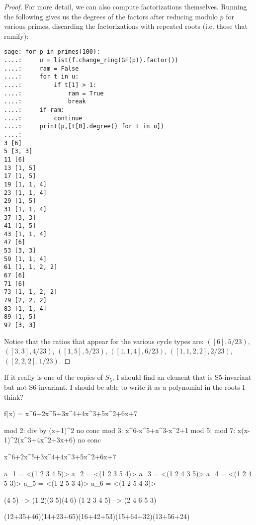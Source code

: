 \begin{proof}
	For more detail, we can also compute factorizations themselves. Running the following gives us the degrees of the factors after reducing modulo $p$ for various primes, discarding the factorizations with repeated roots (i.e. those that ramify):
	\begin{verbatim}
sage: for p in primes(100):
....:     u = list(f.change_ring(GF(p)).factor())
....:     ram = False
....:     for t in u:
....:         if t[1] > 1:
....:             ram = True
....:             break
....:     if ram:
....:         continue
....:     print(p,[t[0].degree() for t in u])
....:     
3 [6]
5 [3, 3]
11 [6]
13 [1, 5]
17 [1, 5]
19 [1, 1, 4]
23 [1, 1, 4]
29 [1, 5]
31 [1, 1, 4]
37 [3, 3]
41 [1, 5]
43 [1, 1, 4]
47 [6]
53 [3, 3]
59 [1, 1, 4]
61 [1, 1, 2, 2]
67 [6]
71 [6]
73 [1, 1, 2, 2]
79 [2, 2, 2]
83 [1, 1, 4]
89 [1, 5]
97 [3, 3]
	\end{verbatim}
	Notice that the ratios that appear for the various cycle types are: $([6], 5/23)$, $([3,3], 4/23)$, $([1,5], 5/23)$, $([1,1,4], 6/23)$, $([1,1,2,2], 2/23)$, $([2,2,2], 1/23)$.
\end{proof}

If it really is one of the copies of $S_5$, I should find an element that is S5-invariant but not S6-invariant. I should be able to write it as a polynomial in the roots I think?

f(x) = x^6+2x^5+3x^4+4x^3+5x^2+6x+7


mod 2: div by (x+1)^2			no conc
mod 3: x^6-x^5+x^3-x^2+1		
mod 5: 
mod 7: x(x-1)^2(x^3+4x^2+3x+6)	no conc

x^6+2x^5+3x^4+4x^3+5x^2+6x+7




a_1 = <(1 2 3 4 5)>
a_2 = <(1 2 3 5 4)>
a_3 = <(1 2 4 3 5)>
a_4 = <(1 2 4 5 3)>
a_5 = <(1 2 5 3 4)>
a_6 = <(1 2 5 4 3)>

(4 5) --> (1 2)(3 5)(4 6)
(1 2 3 4 5) --> (2 4 6 5 3)

(12+35+46)(14+23+65)(16+42+53)(15+64+32)(13+56+24)
